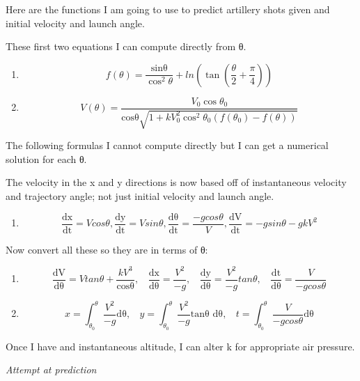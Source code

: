 \documentclass[
]{article}
\providecommand{\tightlist}{%
  \setlength{\itemsep}{0pt}\setlength{\parskip}{0pt}}
\begin{document}
Here are the functions I am going to use to predict artillery shots
given and initial velocity and launch angle.

These first two equations I can compute directly from θ.

\begin{enumerate}
\def\labelenumi{\arabic{enumi}.}
\item
  \[f\left( \theta \right) = \frac{\text{sinθ}}{\cos^{2}\theta} + ln\left(
  \tan\left( \frac{\theta}{2} + \frac{\pi}{4} \right) \right)\]
\item
  \[V\left( \theta \right) = \frac{V_{0}\cos\theta_{0}}{\text{cosθ}\sqrt{1 +
  kV_{0}^{2}\cos^{2}\theta_{0}\left( f\left( \theta_{0} \right) - f\left(
  \theta \right) \right)}}\]
\end{enumerate}

The following formulas I cannot compute directly but I can get a
numerical solution for each θ.

The velocity in the x and y directions is now based off of instantaneous
velocity and trajectory angle; not just initial velocity and launch
angle.

\begin{enumerate}
\def\labelenumi{\arabic{enumi}.}
\tightlist
\item
  \[\frac{\text{dx}}{\text{dt}} = Vcos\theta,
  \frac{\text{dy}}{\text{dt}} = Vsin\theta,
  \frac{\text{dθ}}{\text{dt}} = \frac{- gcos\theta}{V},
  \frac{\text{dV}}{\text{dt}} = - gsin\theta - gkV^{2}\]
\end{enumerate}

Now convert all these so they are in terms of θ:

\begin{enumerate}
\def\labelenumi{\arabic{enumi}.}
\item
  \[\frac{\text{dV}}{\text{dθ}} = Vtan\theta + \frac{kV^{3}}{\text{cosθ}},\ \
  \ \ \frac{\text{dx}}{\text{dθ}} = \frac{V^{2}}{- g},\ \ \ \
  \frac{\text{dy}}{\text{dθ}} = \frac{V^{2}}{- g}tan\theta,\ \ \ \
  \frac{\text{dt}}{\text{dθ}} = \frac{V}{- gcos\theta}\]
\item
  \[x = \int_{\theta_{0}}^{\theta}{\frac{V^{2}}{- g}\text{dθ}},\ \ \ \ y =
  \int_{\theta_{0}}^{\theta}{\frac{V^{2}}{- g}\text{tanθ dθ}},\ \ \ \ t =
  \int_{\theta_{0}}^{\theta}{\frac{V}{- gcos\theta}\text{dθ}}\]
\end{enumerate}

Once I have and instantaneous altitude, I can alter k for appropriate
air pressure.

\emph{Attempt at prediction}
\end{document}
